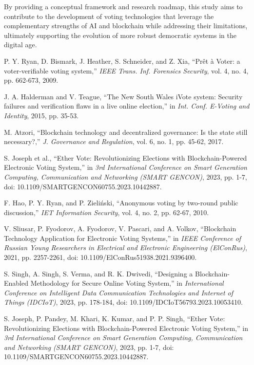 \documentclass[conference]{IEEEtran}
\begin{document}
By providing a conceptual framework and research roadmap, this study aims to contribute to the development of voting technologies that leverage the complementary strengths of AI and blockchain while addressing their limitations, ultimately supporting the evolution of more robust democratic systems in the digital age.

\begin{thebibliography}{20}
P. Y. Ryan, D. Bismark, J. Heather, S. Schneider, and Z. Xia, ``Prêt à Voter: a voter-verifiable voting system,'' {\it IEEE Trans. Inf. Forensics Security}, vol. 4, no. 4, pp. 662-673, 2009.

J. A. Halderman and V. Teague, ``The New South Wales iVote system: Security failures and verification flaws in a live online election,'' in {\it Int. Conf. E-Voting and Identity}, 2015, pp. 35-53.

M. Atzori, ``Blockchain technology and decentralized governance: Is the state still necessary?,'' {\it J. Governance and Regulation}, vol. 6, no. 1, pp. 45-62, 2017.

S. Joseph et al., ``Ether Vote: Revolutionizing Elections with Blockchain-Powered Electronic Voting System,'' in {\it 3rd International Conference on Smart Generation Computing, Communication and Networking (SMART GENCON)}, 2023, pp. 1-7, doi: 10.1109/SMARTGENCON60755.2023.10442887.

F. Hao, P. Y. Ryan, and P. Zieliński, ``Anonymous voting by two-round public discussion,'' {\it IET Information Security}, vol. 4, no. 2, pp. 62-67, 2010.

V. Sliusar, P. Fyodorov, A. Fyodorov, V. Pascari, and A. Volkov, ``Blockchain Technology Application for Electronic Voting Systems,'' in {\it IEEE Conference of Russian Young Researchers in Electrical and Electronic Engineering (ElConRus)}, 2021, pp. 2257-2261, doi: 10.1109/ElConRus51938.2021.9396400.

S. Singh, A. Singh, S. Verma, and R. K. Dwivedi, ``Designing a Blockchain-Enabled Methodology for Secure Online Voting System,'' in {\it International Conference on Intelligent Data Communication Technologies and Internet of Things (IDCIoT)}, 2023, pp. 178-184, doi: 10.1109/IDCIoT56793.2023.10053410.

S. Joseph, P. Pandey, M. Khari, K. Kumar, and P. P. Singh, ``Ether Vote: Revolutionizing Elections with Blockchain-Powered Electronic Voting System,'' in {\it 3rd International Conference on Smart Generation Computing, Communication and Networking (SMART GENCON)}, 2023, pp. 1-7, doi: 10.1109/SMARTGENCON60755.2023.10442887.


\end{thebibliography}
\end{document}
